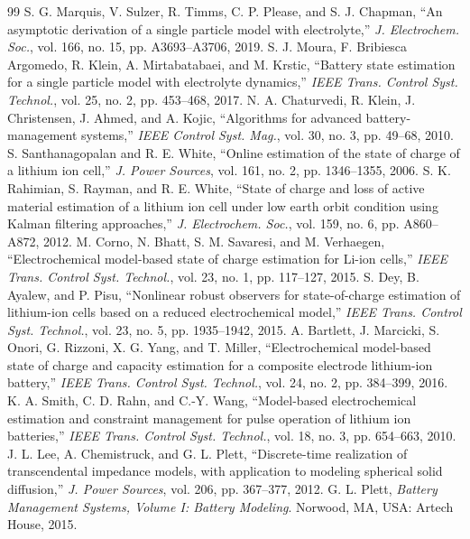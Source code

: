 \documentclass[journal]{IEEEtran}
\begin{document}
\begin{thebibliography}{99}
 S. G. Marquis, V. Sulzer, R. Timms, C. P. Please, and S. J. Chapman, ``An asymptotic derivation of a single particle model with electrolyte,'' \emph{J. Electrochem. Soc.}, vol. 166, no. 15, pp. A3693--A3706, 2019.
 S. J. Moura, F. Bribiesca Argomedo, R. Klein, A. Mirtabatabaei, and M. Krstic, ``Battery state estimation for a single particle model with electrolyte dynamics,'' \emph{IEEE Trans. Control Syst. Technol.}, vol. 25, no. 2, pp. 453--468, 2017.
 N. A. Chaturvedi, R. Klein, J. Christensen, J. Ahmed, and A. Kojic, ``Algorithms for advanced battery-management systems,'' \emph{IEEE Control Syst. Mag.}, vol. 30, no. 3, pp. 49--68, 2010.
 S. Santhanagopalan and R. E. White, ``Online estimation of the state of charge of a lithium ion cell,'' \emph{J. Power Sources}, vol. 161, no. 2, pp. 1346--1355, 2006.
 S. K. Rahimian, S. Rayman, and R. E. White, ``State of charge and loss of active material estimation of a lithium ion cell under low earth orbit condition using Kalman filtering approaches,'' \emph{J. Electrochem. Soc.}, vol. 159, no. 6, pp. A860--A872, 2012.
 M. Corno, N. Bhatt, S. M. Savaresi, and M. Verhaegen, ``Electrochemical model-based state of charge estimation for Li-ion cells,'' \emph{IEEE Trans. Control Syst. Technol.}, vol. 23, no. 1, pp. 117--127, 2015.
 S. Dey, B. Ayalew, and P. Pisu, ``Nonlinear robust observers for state-of-charge estimation of lithium-ion cells based on a reduced electrochemical model,'' \emph{IEEE Trans. Control Syst. Technol.}, vol. 23, no. 5, pp. 1935--1942, 2015.
 A. Bartlett, J. Marcicki, S. Onori, G. Rizzoni, X. G. Yang, and T. Miller, ``Electrochemical model-based state of charge and capacity estimation for a composite electrode lithium-ion battery,'' \emph{IEEE Trans. Control Syst. Technol.}, vol. 24, no. 2, pp. 384--399, 2016.
 K. A. Smith, C. D. Rahn, and C.-Y. Wang, ``Model-based electrochemical estimation and constraint management for pulse operation of lithium ion batteries,'' \emph{IEEE Trans. Control Syst. Technol.}, vol. 18, no. 3, pp. 654--663, 2010.
 J. L. Lee, A. Chemistruck, and G. L. Plett, ``Discrete-time realization of transcendental impedance models, with application to modeling spherical solid diffusion,'' \emph{J. Power Sources}, vol. 206, pp. 367--377, 2012.
 G. L. Plett, \emph{Battery Management Systems, Volume I: Battery Modeling}. Norwood, MA, USA: Artech House, 2015.

\end{thebibliography}
\end{document}
